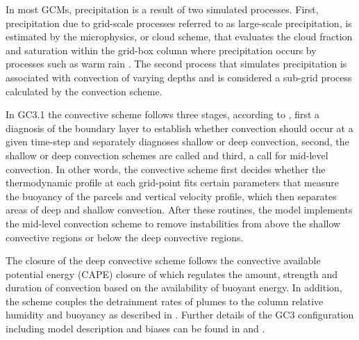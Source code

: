 In most GCMs, precipitation is a result of two simulated processes. First, precipitation due to grid-scale processes referred to as large-scale precipitation, is estimated by the microphysics, or cloud scheme, that evaluates the cloud fraction and saturation within the grid-box column where precipitation occurs by processes such as warm rain \citep{walters2019}. 
The second process that simulates precipitation is associated with convection of varying depths and is considered a sub-grid process calculated by the convection scheme. 

In GC3.1 the convective scheme follows three stages, according to \cite{walters2019}, first a diagnosis of the boundary layer to establish whether convection should occur at a given time-step and separately diagnoses shallow or deep convection, second, the shallow or deep convection schemes are called and third, a call for mid-level convection. 
In other words, the convective scheme first decides whether the thermodynamic profile at each grid-point fits certain parameters that measure the buoyancy of the parcels and vertical velocity profile, which then separates areas of deep and shallow convection. After these routines, the model implements the mid-level convection scheme to remove instabilities from above the shallow convective regions or below the deep convective regions. 

The closure of the deep convective scheme follows the convective available potential energy (CAPE) closure of \cite{fritsch} which regulates the amount, strength and duration of convection based on the availability of buoyant energy. In addition, the scheme couples the detrainment rates of plumes to the column relative humidity and buoyancy as described in \cite{derbyshire2011}.
Further details of the GC3 configuration including model description and biases can be found in \cite{williams2018} and \cite{kuhlbrodt2018}.


